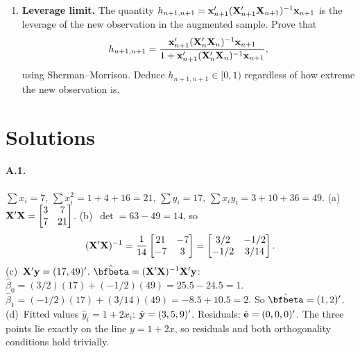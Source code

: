 \documentclass{article}
\begin{document}
\begin{enumerate}[label=\textbf{C.\arabic*},leftmargin=*,itemsep=10pt]
\item  \textbf{Leverage limit.}  The quantity $h_{n+1, n+1} = \mathbf x_{n+1}'({\mathbf X}_{n+1}'{\mathbf X}_{n+1})^{-1}\mathbf x_{n+1}$ is the leverage of the new observation in the augmented sample.  Prove that
$$h_{n+1, n+1} = \frac{\mathbf x_{n+1}'({\mathbf X}_n'{\mathbf X}_n)^{-1}\mathbf x_{n+1}}{1 + \mathbf x_{n+1}'({\mathbf X}_n'{\mathbf X}_n)^{-1}\mathbf x_{n+1}},$$
using Sherman--Morrison.  Deduce $h_{n+1, n+1} \in [0, 1)$ regardless of how extreme the new observation is.

\end{enumerate}

\newpage

\section*{Solutions}

\paragraph{A.1.}  $\sum x_i = 7$, $\sum x_i^2 = 1 + 4 + 16 = 21$, $\sum y_i = 17$, $\sum x_i y_i = 3 + 10 + 36 = 49$.  (a)~${\mathbf X}'{\mathbf X} = \begin{bmatrix}3 & 7\\ 7 & 21\end{bmatrix}$.  (b)~$\det = 63 - 49 = 14$, so
$$({\mathbf X}'{\mathbf X})^{-1} = \frac{1}{14}\begin{bmatrix}21 & -7\\ -7 & 3\end{bmatrix} = \begin{bmatrix}3/2 & -1/2\\ -1/2 & 3/14\end{bmatrix}.$$
(c)~${\mathbf X}'{\mathbf y} = (17, 49)'$.  $\hat\bfbeta = (\bfX'\bfX)^{-1}\bfX'\bfy$: $\hat\beta_0 = (3/2)(17) + (-1/2)(49) = 25.5 - 24.5 = 1$.  $\hat\beta_1 = (-1/2)(17) + (3/14)(49) = -8.5 + 10.5 = 2$.  So $\hat\bfbeta = (1, 2)'$.  (d)~Fitted values $\hat y_i = 1 + 2 x_i$: $\hat{{\mathbf y}} = (3, 5, 9)'$.  Residuals: $\hat{{\mathbf e}} = (0, 0, 0)'$.  The three points lie exactly on the line $y = 1 + 2x$, so residuals and both orthogonality conditions hold trivially.
\end{document}
